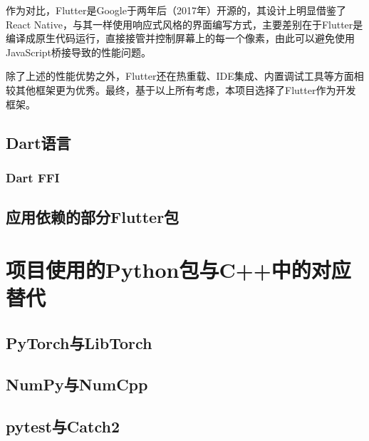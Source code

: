 作为对比，Flutter是Google于两年后（2017年）开源的，其设计上明显借鉴了React Native，与其一样使用响应式风格的界面编写方式，主要差别在于Flutter是编译成原生代码运行，直接接管并控制屏幕上的每一个像素，由此可以避免使用JavaScript桥接导致的性能问题。

除了上述的性能优势之外，Flutter还在热重载、IDE集成、内置调试工具等方面相较其他框架更为优秀。最终，基于以上所有考虑，本项目选择了Flutter作为开发框架。

\subsection{Dart语言}\label{subsec:dart}



\subsubsection{Dart FFI}\label{subsubsec:ffi}


\subsection{应用依赖的部分Flutter包}\label{subsec:flutter-packages}



\section{项目使用的Python包与C++中的对应替代}\label{sec:python-cpp-packages}


\subsection{PyTorch与LibTorch}\label{subsec:pytorch-libtorch}


\subsection{NumPy与NumCpp}\label{subsec:numpy-numcpp}


\subsection{pytest与Catch2}\label{subsec:pytest-catch2}


